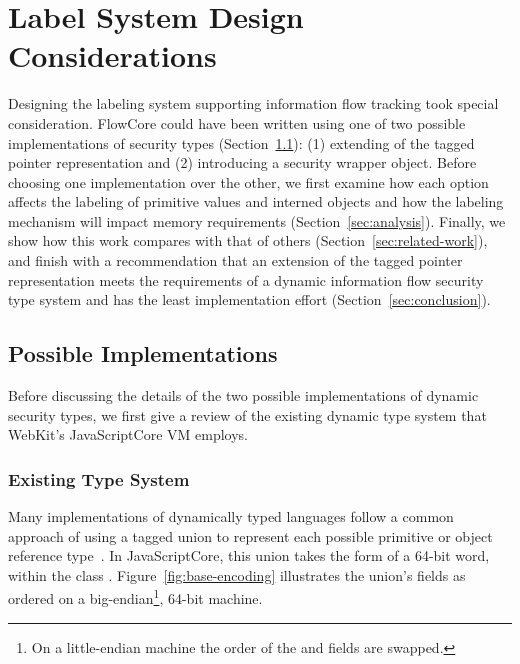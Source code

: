 
\chapter{Label System Design Considerations}

Designing the labeling system supporting information flow tracking took special consideration.
FlowCore could have been written using one of two possible implementations of security types (Section~\ref{sec:implementation}): (1) extending of the tagged pointer representation and (2) introducing a security wrapper object.
Before choosing one implementation over the other, we first examine how each option affects the labeling of primitive values and interned objects and how the labeling mechanism will impact memory requirements (Section~\ref{sec:analysis}).
Finally, we show how this work compares with that of others (Section~\ref{sec:related-work}), and finish with a recommendation that an extension of the tagged pointer representation meets the requirements of a dynamic information flow security type system and has the least implementation effort (Section~\ref{sec:conclusion}).

\section{Possible Implementations}
\label{sec:implementation}

Before discussing the details of the two possible implementations of dynamic security types, we first give a review of the existing dynamic type system that WebKit's JavaScriptCore VM employs.

\subsection{Existing Type System}

Many implementations of dynamically typed languages follow a common approach of using a tagged union to represent each possible primitive or object reference type~\cite{gudeman1993representing}.
In JavaScriptCore, this union takes the form of a 64-bit word, within the class .
Figure~\ref{fig:base-encoding} illustrates the union's fields as ordered on a big-endian\footnote{On a little-endian machine the order of the  and  fields are swapped.}, 64-bit machine.

